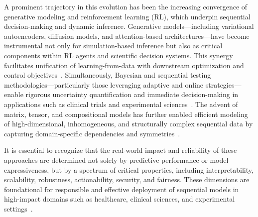 A prominent trajectory in this evolution has been the increasing convergence of generative modeling and reinforcement learning (RL), which underpin sequential decision-making and dynamic inference. Generative models—including variational autoencoders, diffusion models, and attention-based architectures—have become instrumental not only for simulation-based inference but also as critical components within RL agents and scientific decision systems. This synergy facilitates unification of learning-from-data with downstream optimization and control objectives~\cite{ref62,ref63,ref64,ref66,ref67,ref75,ref79,ref86,ref87}. Simultaneously, Bayesian and sequential testing methodologies—particularly those leveraging adaptive and online strategies—enable rigorous uncertainty quantification and immediate decision-making in applications such as clinical trials and experimental sciences~\cite{ref16,ref51,ref64,ref73,ref75,ref84}. The advent of matrix, tensor, and compositional models has further enabled efficient modeling of high-dimensional, inhomogeneous, and structurally complex sequential data by capturing domain-specific dependencies and symmetries~\cite{ref14,ref37,ref39,ref40,ref62}.

It is essential to recognize that the real-world impact and reliability of these approaches are determined not solely by predictive performance or model expressiveness, but by a spectrum of critical properties, including interpretability, scalability, robustness, actionability, security, and fairness. These dimensions are foundational for responsible and effective deployment of sequential models in high-impact domains such as healthcare, clinical sciences, and experimental settings~\cite{ref2,ref7,ref8,ref19,ref24,ref32,ref33,ref35,ref38,ref51,ref55,ref62,ref63,ref64,ref66,ref73,ref85}.


